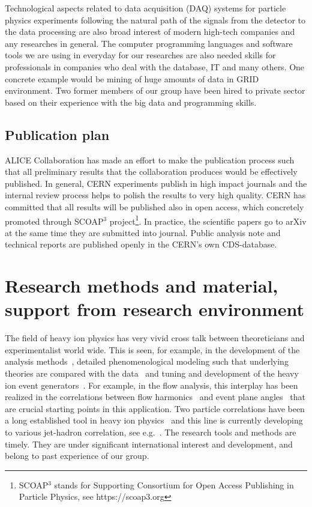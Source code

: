 Technological aspects related to data acquisition (DAQ) systems for particle physics experiments following the natural path of the signals from the detector to the data processing are also broad interest of modern high-tech companies and any researches in general. The computer programming languages and software tools we are using in everyday for our researches are also needed skills for professionals in companies  who deal with the database, IT and many others. One concrete example would be mining of huge amounts of data in GRID environment. Two former members of our group have been hired to private sector based on their experience with the big data and programming skills.

\subsection{Publication plan}

ALICE Collaboration has made an effort to make the publication process such that all preliminary results that the collaboration produces would be effectively published. In general, CERN experiments publish in high impact journals and the internal review process helps to polish the results to very high quality. CERN has committed that all results will be published also in open access, which concretely promoted through SCOAP$^3$ project\footnote{SCOAP$^3$ stands for Supporting Consortium for Open Access Publishing in Particle Physics, see https://scoap3.org}. In practice, the scientific papers go to arXiv at the same time they are submitted into journal. Public analysis note and technical reports are published openly in the CERN's own CDS-database.

\section{Research methods and material, support from research environment} %
\label{sec:researchmethods}

The field of heavy ion physics has very vivid cross talk between theoreticians and experimentalist world wide. This is seen, for example, in the development of the analysis methods~\cite{Poskanzer:1998yz,Bilandzic:2010jr}, detailed phenomenological modeling such that underlying theories are compared with the data~\cite{Burke:2013yra,Renk:2011gj,Niemi:2015qia} and tuning and development of the heavy ion event generators~\cite{Gyulassy:1994ew,Lin:2004en,Lokhtin2006}. For example, in the flow analysis, this interplay has been realized in the correlations between flow harmonics~\cite{Poskanzer:1998yz,ALICE:2011ab} and event plane angles~\cite{Aad:2014fla,Bhalerao:2014xra} that are crucial starting points in this application. Two particle correlations have been a long established tool in heavy ion physics~\cite{PhysRevLett.95.152301,PhysRevLett.97.052301} and this line is currently developing to various jet-hadron correlation, see e.g.~\cite{Khachatryan:2016tfj}. The research tools and methods are timely. They are under significant international interest and development, and belong to past experience of our group.

